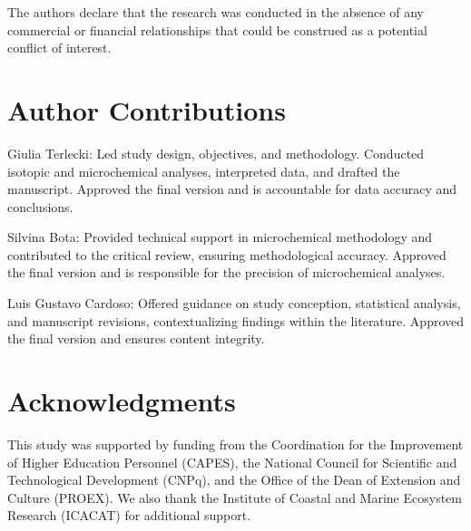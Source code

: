 \documentclass[utf8]{FrontiersinHarvard}
\begin{document}
The authors declare that the research was conducted in the absence of
any commercial or financial relationships that could be construed as a
potential conflict of interest.

\section*{Author Contributions}\label{author-contributions}

Giulia Terlecki: Led study design, objectives, and methodology.
Conducted isotopic and microchemical analyses, interpreted data, and
drafted the manuscript. Approved the final version and is accountable
for data accuracy and conclusions.

Silvina Bota: Provided technical support in microchemical methodology
and contributed to the critical review, ensuring methodological
accuracy. Approved the final version and is responsible for the
precision of microchemical analyses.

Luis Gustavo Cardoso: Offered guidance on study conception, statistical
analysis, and manuscript revisions, contextualizing findings within the
literature. Approved the final version and ensures content integrity.

\section*{Acknowledgments}\label{acknowledgments}

This study was supported by funding from the Coordination for the
Improvement of Higher Education Personnel (CAPES), the National Council
for Scientific and Technological Development (CNPq), and the Office of
the Dean of Extension and Culture (PROEX). We also thank the Institute
of Coastal and Marine Ecosystem Research (ICACAT) for additional
support.
\end{document}
